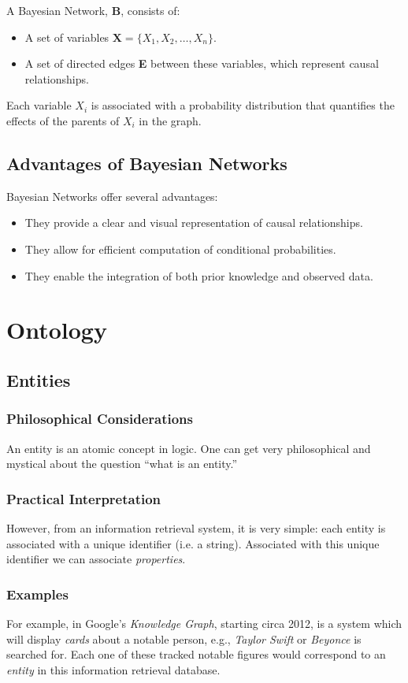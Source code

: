 \documentclass[12pt]{article}
\begin{document}
A Bayesian Network, \textbf{B}, consists of:

\begin{itemize}
    \item A set of variables $\textbf{X} = \{X_1, X_2, \ldots, X_n\}$.
    \item A set of directed edges \textbf{E} between these variables, which represent causal relationships.
\end{itemize}

Each variable \(X_i\) is associated with a probability distribution that quantifies the effects of the parents of \(X_i\) in the graph.

\subsection{Advantages of Bayesian Networks}

Bayesian Networks offer several advantages:

\begin{itemize}
    \item They provide a clear and visual representation of causal relationships.
    \item They allow for efficient computation of conditional probabilities.
    \item They enable the integration of both prior knowledge and observed data.
\end{itemize}
\section{Ontology}
\subsection{Entities}
\subsubsection{Philosophical Considerations}
An entity is an atomic concept in logic.
One can get very philosophical and mystical about the question ``what is an entity.''
\subsubsection{Practical Interpretation}
However, from an information retrieval system, it is very simple: each entity is associated with a unique identifier (i.e. a string).
Associated with this unique identifier we can associate {\em properties}.
\subsubsection{Examples}
For example, in Google's {\em Knowledge Graph}, starting circa 2012, is a system which will display {\em cards} about a notable person, e.g., {\em Taylor Swift} or {\em Beyonce} is searched for.
Each one of these tracked notable figures would correspond to an {\em entity} in this information retrieval database.
\end{document}
